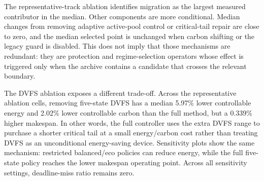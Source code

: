 The representative-track ablation identifies migration as the largest measured contributor in the median. Other components are more conditional. Median changes from removing adaptive active-pool control or critical-tail repair are close to zero, and the median selected point is unchanged when carbon shifting or the legacy guard is disabled. This does not imply that those mechanisms are redundant: they are protection and regime-selection operators whose effect is triggered only when the archive contains a candidate that crosses the relevant boundary.

The DVFS ablation exposes a different trade-off. Across the representative ablation cells, removing five-state DVFS has a median 5.97\% lower controllable energy and 2.02\% lower controllable carbon than the full method, but a 0.339\% higher makespan. In other words, the full controller uses the extra DVFS range to purchase a shorter critical tail at a small energy/carbon cost rather than treating DVFS as an unconditional energy-saving device. Sensitivity plots show the same mechanism: restricted balanced/eco policies can reduce energy, while the full five-state policy reaches the lower makespan operating point. Across all sensitivity settings, deadline-miss ratio remains zero.
